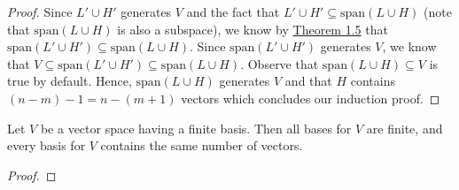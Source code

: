 \begin{proof}
Since \( L' \cup H' \) generates \( V  \) and the fact that \( L' \cup H' \subseteq \text{span}(L \cup H ) \) (note that \( \text{span}(L \cup H)   \) is also a subspace), we know by {\hyperref[Theorem 1.5]{Theorem 1.5}} that \( \text{span}(L' \cup H') \subseteq \text{span}(L \cup H) \). Since \( \text{span}(L' \cup H')  \) generates \( V  \), we know that \( V \subseteq \text{span}(L' \cup H') \subseteq \text{span}(L \cup H ) \). Observe that \( \text{span}(L \cup H ) \subseteq V  \) is true by default. Hence, \( \text{span}(L \cup H ) \) generates \( V  \) and that \( H  \) contains \( (n-m) - 1 = n - (m+1)  \) vectors which concludes our induction proof.
\end{proof}


\begin{corollary}[ ]
   Let \( V  \) be a vector space having a finite basis. Then all bases for \( V  \) are finite, and every basis for \( V  \) contains the same number of vectors. 
\end{corollary}
\begin{proof}

\end{proof}


